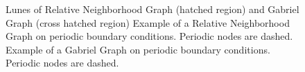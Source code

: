     \begin{figure}[htbp]
        \centering
        \caption[Gabriel - and Relative Neighborhood Graph]
                { Lunes of Relative Neighborhood
                    Graph (hatched region) and
                    Gabriel Graph (cross hatched region)
                  Example of a Relative
                    Neighborhood Graph on periodic boundary conditions.
                    Periodic nodes are dashed.
                  Example of a Gabriel Graph on
                    periodic boundary conditions. Periodic nodes are
                    dashed.
                }
        \label{fig:lunes}

    \end{figure}

